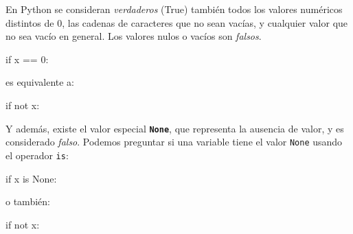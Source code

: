 \documentclass[
  letterpaper,
  DIV=11,
  numbers=noendperiod]{scrreprt}
\newenvironment{Shaded}{\begin{snugshade}}{\end{snugshade}}
\newcommand{\ControlFlowTok}[1]{\textcolor[rgb]{0.00,0.23,0.31}{#1}}
\newcommand{\DecValTok}[1]{\textcolor[rgb]{0.68,0.00,0.00}{#1}}
\newcommand{\KeywordTok}[1]{\textcolor[rgb]{0.00,0.23,0.31}{#1}}
\newcommand{\NormalTok}[1]{\textcolor[rgb]{0.00,0.23,0.31}{#1}}
\newcommand{\OperatorTok}[1]{\textcolor[rgb]{0.37,0.37,0.37}{#1}}
\newcommand{\VariableTok}[1]{\textcolor[rgb]{0.07,0.07,0.07}{#1}}
\begin{document}
\begin{tcolorbox}[enhanced jigsaw, colframe=quarto-callout-tip-color-frame, opacityback=0, opacitybacktitle=0.6, bottomrule=.15mm, toprule=.15mm, coltitle=black, breakable, colback=white, leftrule=.75mm, titlerule=0mm, bottomtitle=1mm, toptitle=1mm, rightrule=.15mm, title=\textcolor{quarto-callout-tip-color}{\faLightbulb}\hspace{0.5em}{Sabías que\ldots{} ?}, arc=.35mm, left=2mm, colbacktitle=quarto-callout-tip-color!10!white]

En Python se consideran \emph{verdaderos} (True) también todos los
valores numéricos distintos de 0, las cadenas de caracteres que no sean
vacías, y cualquier valor que no sea vacío en general. Los valores nulos
o vacíos son \emph{falsos}.

\begin{Shaded}
\begin{Highlighting}[]
\ControlFlowTok{if}\NormalTok{ x }\OperatorTok{==} \DecValTok{0}\NormalTok{:}
\end{Highlighting}
\end{Shaded}

es equivalente a:

\begin{Shaded}
\begin{Highlighting}[]
\ControlFlowTok{if} \KeywordTok{not}\NormalTok{ x:}
\end{Highlighting}
\end{Shaded}

Y además, existe el valor especial \textbf{\texttt{None}}, que
representa la ausencia de valor, y es considerado \emph{falso}. Podemos
preguntar si una variable tiene el valor \texttt{None} usando el
operador \texttt{is}:

\begin{Shaded}
\begin{Highlighting}[]
\ControlFlowTok{if}\NormalTok{ x }\KeywordTok{is} \VariableTok{None}\NormalTok{:}
\end{Highlighting}
\end{Shaded}

o también:

\begin{Shaded}
\begin{Highlighting}[]
\ControlFlowTok{if} \KeywordTok{not}\NormalTok{ x:}
\end{Highlighting}
\end{Shaded}

\end{tcolorbox}
\end{document}
